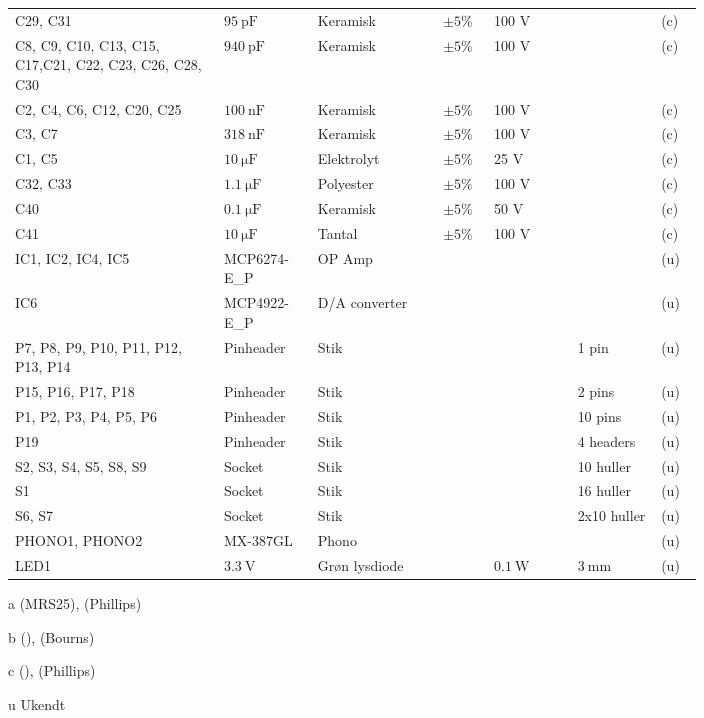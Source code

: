 \begin{table}[h!]
\begin{threeparttable}
\begin{tabular}{p{0.25\linewidth}p{0.1\linewidth}p{0.15\linewidth}p{0.05\linewidth}p{0.1\linewidth}p{0.1\linewidth}p{0.05\linewidth}}
C29, C31 & $\SI{95}{\pico\farad}$ & Keramisk & $\pm 5\%$ & 100 \si{\volt} &  & (c)\\
C8, C9, C10, C13, C15, C17,C21, C22, C23, C26, C28, C30 & $\SI{940}{\pico\farad}$ & Keramisk & $\pm 5\%$ & 100 \si{\volt} &  & (c)\\
C2, C4, C6, C12, C20, C25 & $\SI{100}{\nano\farad}$ & Keramisk & $\pm 5\%$ & 100 \si{\volt} &  & (c)\\
C3, C7  & $\SI{318}{\nano\farad}$ & Keramisk & $\pm 5\%$ & 100 \si{\volt} &  & (c)\\
C1, C5 & $\SI{10}{\micro\farad}$ & Elektrolyt & $\pm 5\%$ & 25 \si{\volt} &  & (c)\\
C32, C33 & $\SI{1.1}{\micro\farad}$ & Polyester & $\pm 5\%$ & 100 \si{\volt} &  & (c)\\

C40 & $\SI{0.1}{\micro\farad}$ & Keramisk & $\pm 5\%$ & 50 \si{\volt} &  & (c)\\
C41 & $\SI{10}{\micro\farad}$ & Tantal & $\pm 5\%$ & 100 \si{\volt} &  & (c)\\
\midrule
IC1, IC2, IC4, IC5 & MCP6274-E\_P & OP Amp &  &  &  & (u) \\
IC6 & MCP4922-E\_P & D/A converter &  &  &  & (u) \\
P7, P8, P9, P10, P11, P12, P13, P14 & Pinheader & Stik &  &  & 1 pin & (u) \\
P15, P16, P17, P18 & Pinheader & Stik &  &  & 2 pins & (u) \\
P1, P2, P3, P4, P5, P6 & Pinheader & Stik &  &  & 10 pins & (u) \\
P19 & Pinheader & Stik &  &  & 4 headers & (u) \\
S2, S3, S4, S5, S8, S9 & Socket & Stik &  &  & 10 huller & (u) \\
S1 & Socket & Stik &  &  & 16 huller & (u) \\
S6, S7 & Socket & Stik &  &  & 2x10 huller & (u) \\
PHONO1, PHONO2 & MX-387GL & Phono &  &  &  & (u) \\
LED1 & $\SI{3.3}{\volt}$ & Grøn lysdiode &  & $\SI{0.1}{\watt}$ & $\SI{3}{\milli\meter}$ & (u) \\
\hline
\bottomrule
\end{tabular}
\begin{tablenotes}
\item[a] (MRS25), (Phillips)
\item[b] (), (Bourns)
\item[c] (), (Phillips)
\item[u] Ukendt
\end{tablenotes}
\end{threeparttable}
\end{table} 
